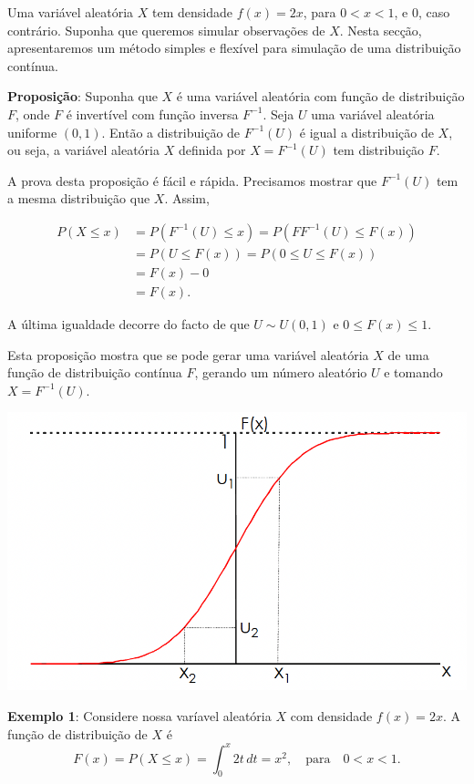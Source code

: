 \documentclass[
]{book}
\begin{document}
Uma variável aleatória \(X\) tem densidade \(f(x)=2x\), para \(0<x<1\), e 0,
caso contrário. Suponha que queremos simular observações de \(X\). Nesta
secção, apresentaremos um método simples e flexível para simulação de
uma distribuição contínua.

\textbf{Proposição}: Suponha que \(X\) é uma variável aleatória com função de
distribuição \(F\), onde \(F\) é invertível com função inversa \(F^{-1}\).
Seja \(U\) uma variável aleatória uniforme \((0,1)\). Então a distribuição
de \(F^{-1}(U)\) é igual a distribuição de \(X\), ou seja, a variável
aleatória \(X\) definida por \(X=F^{-1}(U)\) tem distribuição \(F\).

A prova desta proposição é fácil e rápida. Precisamos mostrar que
\(F^{-1}(U)\) tem a mesma distribuição que \(X\). Assim,

\begin{align*}
P(X \leq x) &= P(F^{-1}(U)\leq x) = P(FF^{-1}(U) \leq F(x)) \\
&= P(U \leq F(x)) = P(0\leq U \leq F(x)) \\
&= F(x)-0 \\
&= F(x).
\end{align*}

A última igualdade decorre do facto de que \(U\sim U(0,1)\) e
\(0\leq F(x) \leq 1\).

Esta proposição mostra que se pode gerar uma variável aleatória \(X\) de
uma função de distribuição contínua \(F\), gerando um número aleatório \(U\)
e tomando \(X = F^{-1}(U)\).

\includegraphics{docs/transf_inversa2.png}

\textbf{Exemplo 1}: Considere nossa varíavel aleatória \(X\) com densidade
\(f(x)=2x\). A função de distribuição de \(X\) é
\[F(x)=P(X\leq x)=\int_{0}^{x}2t\, dt = x^2, \quad \text{para} \quad 0<x<1.\]
\end{document}
